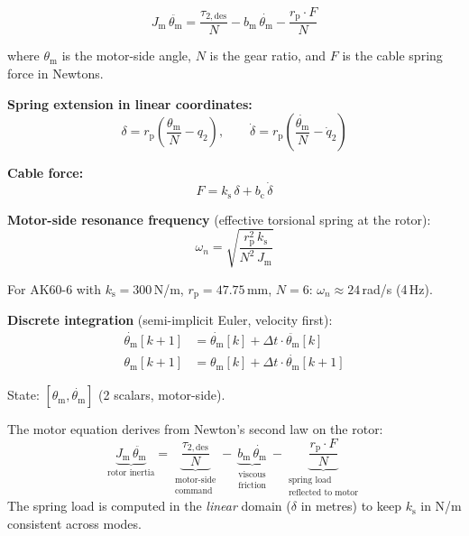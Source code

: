 \documentclass[11pt,a4paper]{article}
\newcommand{\rp}{r_{\mathrm{p}}}
\newcommand{\ks}{k_{\mathrm{s}}}
\newcommand{\bc}{b_{\mathrm{c}}}
\newcommand{\Jm}{J_{\mathrm{m}}}
\newcommand{\thetam}{\theta_{\mathrm{m}}}
\begin{document}
\begin{equation}
\boxed{\Jm \, \ddot{\thetam} = \frac{\tau_{2,\mathrm{des}}}{N} - b_{\mathrm{m}} \, \dot{\thetam} - \frac{\rp \cdot F}{N}}
\label{eq:torque_mode}
\end{equation}

where $\thetam$ is the motor-side angle, $N$ is the gear ratio, and $F$ is the cable spring force in Newtons.

\textbf{Spring extension in linear coordinates:}
\begin{equation}
    \delta = \rp \!\left(\frac{\thetam}{N} - q_2\right), \qquad
    \dot{\delta} = \rp \!\left(\frac{\dot{\thetam}}{N} - \dot{q}_2\right)
\label{eq:delta_torque}
\end{equation}

\textbf{Cable force:}
\begin{equation}
    F = \ks \, \delta + \bc \, \dot{\delta}
\label{eq:F_torque}
\end{equation}

\textbf{Motor-side resonance frequency} (effective torsional spring at the rotor):
\begin{equation}
    \omega_n = \sqrt{\frac{\rp^2 \, \ks}{N^2 \, \Jm}}
\label{eq:omega_n}
\end{equation}

For AK60-6 with $\ks = 300$\,N/m, $\rp = 47.75$\,mm, $N = 6$: $\omega_n \approx 24$\,rad/s (4\,Hz).

\textbf{Discrete integration} (semi-implicit Euler, velocity first):
\begin{align}
    \dot{\thetam}[k{+}1] &= \dot{\thetam}[k] + \Delta t \cdot \ddot{\thetam}[k] \\
    \thetam[k{+}1] &= \thetam[k] + \Delta t \cdot \dot{\thetam}[k{+}1]
\label{eq:torque_discrete}
\end{align}

State: $[\thetam, \dot{\thetam}]$ (2 scalars, motor-side).

\begin{codemath}
The motor equation derives from Newton's second law on the rotor:
\[
    \underbrace{\Jm \, \ddot{\thetam}}_{\text{rotor inertia}} =
    \underbrace{\frac{\tau_{2,\mathrm{des}}}{N}}_{\substack{\text{motor-side}\\\text{command}}} -
    \underbrace{b_{\mathrm{m}} \, \dot{\thetam}}_{\substack{\text{viscous}\\\text{friction}}} -
    \underbrace{\frac{\rp \cdot F}{N}}_{\substack{\text{spring load}\\\text{reflected to motor}}}
\]
The spring load is computed in the \emph{linear} domain ($\delta$ in metres) to keep $\ks$ in N/m consistent across modes.
\end{codemath}
\end{document}
